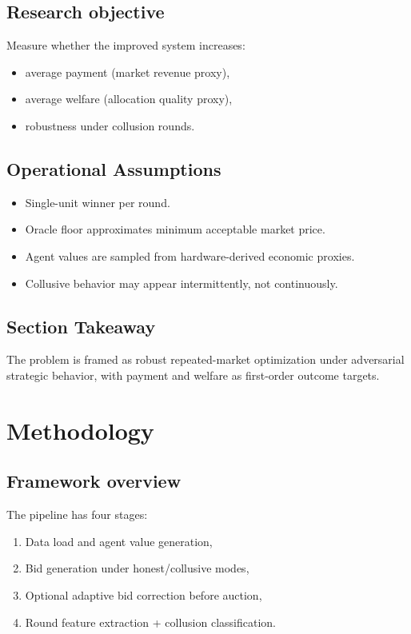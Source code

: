 \documentclass[journal]{IEEEtran}
\begin{document}
\subsection{Research objective}
Measure whether the improved system increases:
\begin{itemize}[leftmargin=*]
    \item average payment (market revenue proxy),
    \item average welfare (allocation quality proxy),
    \item robustness under collusion rounds.
\end{itemize}

\subsection{Operational Assumptions}
\begin{itemize}[leftmargin=*]
    \item Single-unit winner per round.
    \item Oracle floor approximates minimum acceptable market price.
    \item Agent values are sampled from hardware-derived economic proxies.
    \item Collusive behavior may appear intermittently, not continuously.
\end{itemize}

\subsection{Section Takeaway}
The problem is framed as robust repeated-market optimization under adversarial strategic behavior, with payment and welfare as first-order outcome targets.

\section{Methodology}
\subsection{Framework overview}
The pipeline has four stages:
\begin{enumerate}[leftmargin=*]
    \item Data load and agent value generation,
    \item Bid generation under honest/collusive modes,
    \item Optional adaptive bid correction before auction,
    \item Round feature extraction + collusion classification.
\end{enumerate}
\end{document}
